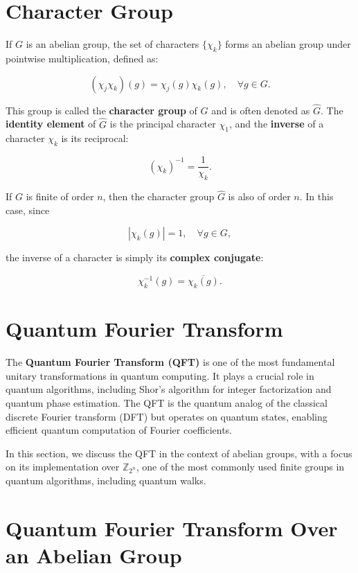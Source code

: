 \documentclass[11pt]{article}
\theoremstyle{definition}
\begin{document}
\section*{Character Group}

If \( G \) is an abelian group, the set of characters \( \{\chi_k\} \) forms an abelian group under pointwise multiplication, defined as:  

\[
(\chi_j \chi_k)(g) = \chi_j(g) \chi_k(g), \quad \forall g \in G.
\]

This group is called the \textbf{character group} of \( G \) and is often denoted as $\hat{G}$.  
The \textbf{identity element} of \( \hat{G} \) is the principal character \( \chi_1 \), and the \textbf{inverse} of a character \( \chi_k \) is its reciprocal:  

\[
(\chi_k)^{-1} = \frac{1}{\chi_k}.
\]

If \( G \) is finite of order \( n \), then the character group \( \hat{G} \) is also of order \( n \). In this case, since  

\[
|\chi_k(g)| = 1, \quad \forall g \in G,
\]

the inverse of a character is simply its \textbf{complex conjugate}:

\[
\chi_k^{-1}(g) = \overline{\chi_k(g)}.
\]


\section{Quantum Fourier Transform}

The \textbf{Quantum Fourier Transform (QFT)} is one of the most fundamental unitary transformations in quantum computing. It plays a crucial role in quantum algorithms, including Shor’s algorithm for integer factorization and quantum phase estimation. The QFT is the quantum analog of the classical discrete Fourier transform (DFT) but operates on quantum states, enabling efficient quantum computation of Fourier coefficients.

In this section, we discuss the QFT in the context of abelian groups, with a focus on its implementation over \( \mathbb{Z}_{2^n} \), one of the most commonly used finite groups in quantum algorithms, including quantum walks.

\section{Quantum Fourier Transform Over an Abelian Group}
\end{document}
